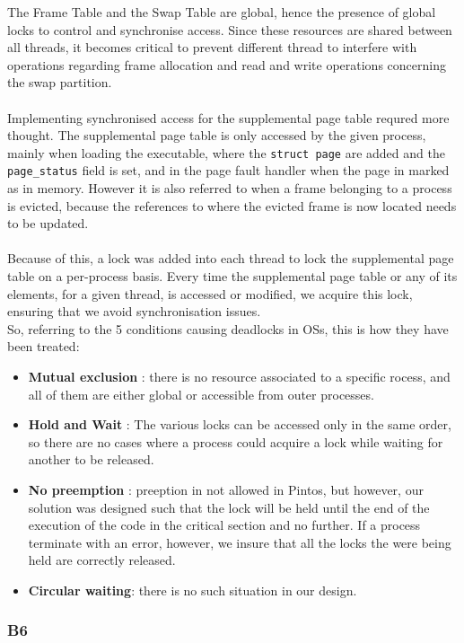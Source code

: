 \documentclass[a4wide, 11pt]{article}
\newcommand{\tx}{\texttt}
\begin{document}
The Frame Table and the Swap Table are global, hence the presence of global locks to control and synchronise access. Since these resources are shared between all threads, it becomes critical to prevent different thread to interfere with operations regarding frame allocation and read and write operations concerning the swap partition.\\
\\
Implementing synchronised access for the supplemental page table requred more thought. The supplemental page table is only accessed by the given process, mainly when loading the executable, where the \tx{struct page} are added and the \tx{page\_status} field is set, and in the page fault handler when the page in marked as in memory. However it is also referred to when a frame belonging to a process is evicted, because the references to where the evicted frame is now located needs to be updated.\\
\\
Because of this, a lock was added into each thread to lock the supplemental page table on a per-process basis. Every time the supplemental page table or any of its elements, for a given thread, is accessed or modified, we acquire this lock, ensuring that we avoid synchronisation issues.
\\
So, referring to the 5 conditions causing deadlocks in OSs, this is how they have been treated:
\begin{itemize}
\item \textbf{Mutual exclusion} : there is no resource associated to a specific rocess, and all of them are either global or accessible from outer processes.
\item \textbf{Hold and Wait} : The various locks can be accessed only in the same order, so there are no cases where a process could acquire a lock while waiting for another to be released.
\item \textbf{No preemption} : preeption in not allowed in Pintos, but however, our solution was designed such that the lock will be held until the end of the execution of the code in the critical section and no further. If a process terminate with an error, however, we insure that all the locks the were being held are correctly released.
\item \textbf{Circular waiting}: there is no such situation in our design.
\end{itemize}

\subsubsection{B6}
\end{document}
